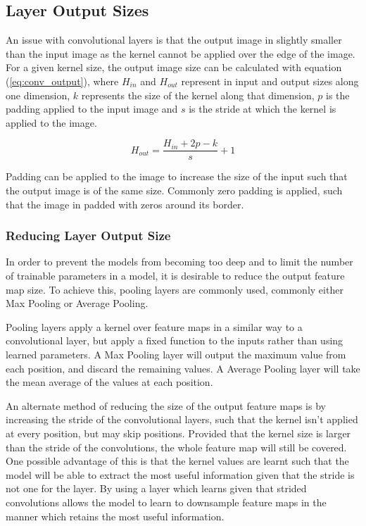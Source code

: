 \subsection{Layer Output Sizes}
An issue with convolutional layers is that the output image in slightly smaller than the input image as the kernel cannot be applied over the edge of the image.
For a given kernel size, the output image size can be calculated with equation (\ref{eq:conv_output}), where $H_{in}$ and $H_{out}$ represent in input and output sizes along one dimension, $k$ represents the size of the kernel along that dimension, $p$ is the padding applied to the input image and $s$ is the stride at which the kernel is applied to the image.

\begin{equation} \label{eq:conv_output}
    H_{out} = \frac{H_{in} + 2p - k}{s} + 1
\end{equation}

Padding can be applied to the image to increase the size of the input such that the output image is of the same size.
Commonly zero padding is applied, such that the image in padded with zeros around its border.

\subsubsection{Reducing Layer Output Size}
In order to prevent the models from becoming too deep and to limit the number of trainable parameters in a model, it is desirable to reduce the output feature map size.
To achieve this, pooling layers are commonly used, commonly either Max Pooling or Average Pooling.

Pooling layers apply a kernel over feature maps in a similar way to a convolutional layer, but apply a fixed function to the inputs rather than using learned parameters.
A Max Pooling layer will output the maximum value from each position, and discard the remaining values.
A Average Pooling layer will take the mean average of the values at each position.

An alternate method of reducing the size of the output feature maps is by increasing the stride of the convolutional layers, such that the kernel isn't applied at every position, but may skip positions.
Provided that the kernel size is larger than the stride of the convolutions, the whole feature map will still be covered.
One possible advantage of this is that the kernel values are learnt such that the model will be able to extract the most useful information given that the stride is not one for the layer.
By using a layer which learns given that strided convolutions allows the model to learn to downsample feature maps in the manner which retains the most useful information.

